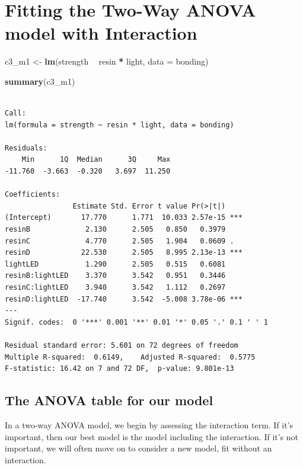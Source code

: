 \documentclass[]{book}
\newenvironment{Shaded}{\begin{snugshade}}{\end{snugshade}}
\newcommand{\KeywordTok}[1]{\textcolor[rgb]{0.13,0.29,0.53}{\textbf{#1}}}
\newcommand{\DataTypeTok}[1]{\textcolor[rgb]{0.13,0.29,0.53}{#1}}
\newcommand{\StringTok}[1]{\textcolor[rgb]{0.31,0.60,0.02}{#1}}
\newcommand{\OperatorTok}[1]{\textcolor[rgb]{0.81,0.36,0.00}{\textbf{#1}}}
\newcommand{\NormalTok}[1]{#1}
\theoremstyle{definition}
\theoremstyle{definition}
\theoremstyle{definition}
\theoremstyle{remark}
\begin{document}
\section{Fitting the Two-Way ANOVA model with
Interaction}\label{fitting-the-two-way-anova-model-with-interaction}

\begin{Shaded}
\begin{Highlighting}[]
\NormalTok{c3_m1 <-}\StringTok{ }\KeywordTok{lm}\NormalTok{(strength }\OperatorTok{~}\StringTok{ }\NormalTok{resin }\OperatorTok{*}\StringTok{ }\NormalTok{light, }\DataTypeTok{data =}\NormalTok{ bonding)}

\KeywordTok{summary}\NormalTok{(c3_m1)}
\end{Highlighting}
\end{Shaded}

\begin{verbatim}

Call:
lm(formula = strength ~ resin * light, data = bonding)

Residuals:
    Min      1Q  Median      3Q     Max 
-11.760  -3.663  -0.320   3.697  11.250 

Coefficients:
                Estimate Std. Error t value Pr(>|t|)    
(Intercept)       17.770      1.771  10.033 2.57e-15 ***
resinB             2.130      2.505   0.850   0.3979    
resinC             4.770      2.505   1.904   0.0609 .  
resinD            22.530      2.505   8.995 2.13e-13 ***
lightLED           1.290      2.505   0.515   0.6081    
resinB:lightLED    3.370      3.542   0.951   0.3446    
resinC:lightLED    3.940      3.542   1.112   0.2697    
resinD:lightLED  -17.740      3.542  -5.008 3.78e-06 ***
---
Signif. codes:  0 '***' 0.001 '**' 0.01 '*' 0.05 '.' 0.1 ' ' 1

Residual standard error: 5.601 on 72 degrees of freedom
Multiple R-squared:  0.6149,    Adjusted R-squared:  0.5775 
F-statistic: 16.42 on 7 and 72 DF,  p-value: 9.801e-13
\end{verbatim}

\subsection{The ANOVA table for our
model}\label{the-anova-table-for-our-model}

In a two-way ANOVA model, we begin by assessing the interaction term. If
it's important, then our best model is the model including the
interaction. If it's not important, we will often move on to consider a
new model, fit without an interaction.
\end{document}
